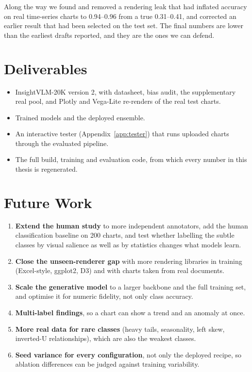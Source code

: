Along the way we found and removed a rendering leak that had inflated accuracy on
real time-series charts to 0.94--0.96 from a true 0.31--0.41, and corrected an earlier result that had been
selected on the test set. The final numbers are lower than the earliest drafts reported,
and they are the ones we can defend.

\section{Deliverables}

\begin{itemize}[leftmargin=1.3em]
  \item InsightVLM-20K version 2, with datasheet, bias audit, the supplementary real pool,
  and Plotly and Vega-Lite re-renders of the real test charts.
  \item Trained models and the deployed ensemble.
  \item An interactive tester (Appendix~\ref{app:tester}) that runs uploaded charts
  through the evaluated pipeline.
  \item The full build, training and evaluation code, from which every number in this
  thesis is regenerated.
\end{itemize}

\section{Future Work}

\begin{enumerate}[leftmargin=1.4em]
  \item \textbf{Extend the human study} to more independent annotators, add the human
  classification baseline on 200 charts, and test whether labelling the subtle classes by
  visual salience as well as by statistics changes what models learn.
  \item \textbf{Close the unseen-renderer gap} with more rendering libraries in training
  (Excel-style, ggplot2, D3) and with charts taken from real documents.
  \item \textbf{Scale the generative model} to a larger backbone and the full training set,
  and optimise it for numeric fidelity, not only class accuracy.
  \item \textbf{Multi-label findings}, so a chart can show a trend and an anomaly at once.
  \item \textbf{More real data for rare classes} (heavy tails, seasonality, left skew,
  inverted-U relationships), which are also the weakest classes.
  \item \textbf{Seed variance for every configuration}, not only the deployed recipe, so
  ablation differences can be judged against training variability.
\end{enumerate}
